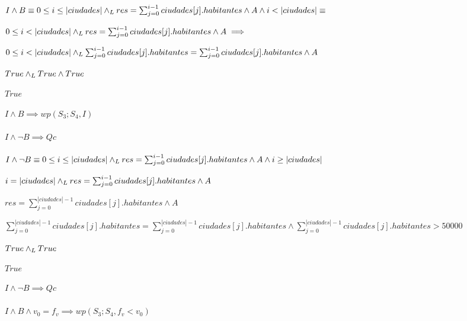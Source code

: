 \documentclass[10pt,a4paper]{article}
\begin{document}
$I \wedge B \equiv 0 \leq i \leq |ciudades| \land _L res = \sum_{j=0}^{i-1} ciudades[j].habitantes \wedge A \wedge i < |ciudades| \equiv$\par

\begin{center}
$0 \leq i < |ciudades| \land _L res = \sum_{j=0}^{i-1} ciudades[j].habitantes \wedge A \implies  $ \par
\vspace{5px}
$ 0 \leq i < |ciudades| \land _L \sum_{j=0}^{i-1} ciudades[j].habitantes = \sum_{j=0}^{i-1} ciudades[j].habitantes \wedge A$  \equiv \par
\vspace{5px}
$True \land _L True \wedge True$ \equiv \par
\vspace{5px}
$True$\par
\vspace{5px}
    $I \wedge B \implies wp(S_{3};S_{4}, I)$
\end{center}

\paragraph{$I \wedge \neg B \implies Qc$}
$I \wedge \neg B \equiv 0 \leq i \leq |ciudades| \land _L res = \sum_{j=0}^{i-1} ciudades[j].habitantes \wedge A \wedge i \geq |ciudades| $ \equiv \par

\begin{center}
  $i = |ciudades| \land _L res = \sum_{j=0}^{i-1} ciudades[j].habitantes \wedge A$ \equiv \par
\vspace{5px}  
$res = \sum_{j=0}^{|ciudades|-1} ciudades[j].habitantes \wedge A$ \implies \par
\vspace{5px} 
$\sum_{j=0}^{|ciudades|-1} ciudades[j].habitantes = \sum_{j=0}^{|ciudades|-1} ciudades[j].habitantes \wedge \sum_{j=0}^{|ciudades|-1} ciudades[j].habitantes > 50000$  \par
\vspace{5px}
\equiv \; $True \land _L True$ \equiv \par
\vspace{5px}
$True$\par
\vspace{5px}
$I \wedge \neg B \implies Qc$
\end{center}

\paragraph{$I \wedge  B \wedge v_{0}=f_{v} \implies wp(S_{3};S_{4}, f_{v} < v_{0})$}
\end{document}
